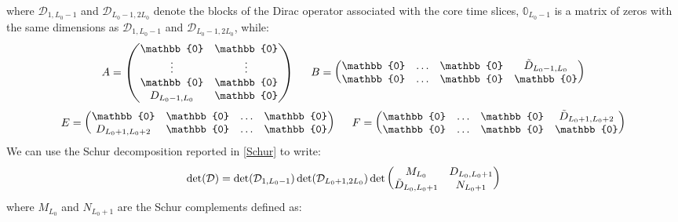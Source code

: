 where $\mathcal{D}_{1, L_0 - 1}$ and $\mathcal{D}_{L_0 - 1, 2L_0}$ denote the blocks of the Dirac operator associated with the core time slices, $\mathbb{0}_{L_0 - 1}$ is a matrix of zeros with the same dimensions as $\mathcal{D}_{1, L_0 - 1}$ and $\mathcal{D}_{L_0 - 1, 2L_0}$, while:
\begin{equation*}
    A = \begin{pmatrix}
         \mathbb{0} & \mathbb{0} \\
        \vdots & \vdots \\
        \mathbb{0} & \mathbb{0} \\
        D_{L_0 - 1, L_0} & \mathbb{0} \\
    \end{pmatrix} \hspace{5mm} B = \begin{pmatrix}
        \mathbb{0} & \dots & \mathbb{0} & \Tilde{D}_{L_0-1, L_0} \\
        \mathbb{0} & \dots & \mathbb{0} & \mathbb{0} \\
    \end{pmatrix}
\end{equation*}
\begin{equation}
    E = \begin{pmatrix}
        \mathbb{0} & \mathbb{0} & \dots & \mathbb{0} \\
        D_{L_0 + 1, L_0 + 2} & \mathbb{0} & \dots & \mathbb{0} \\
    \end{pmatrix} \hspace{5mm} F = \begin{pmatrix}
        \mathbb{0} & \dots & \mathbb{0} & \Tilde{D}_{L_0+1, L_0+2} \\
        \mathbb{0} & \dots & \mathbb{0} & \mathbb{0}\\
    \end{pmatrix}
\end{equation}
We can use the Schur decomposition reported in \eqref{Schur} to write:
\begin{equation}\label{D decomp M N}
    \det(\mathcal{D}) = \det(\mathcal{D}_{1, L_0 - 1}) \det (\mathcal{D}_{L_0 + 1, 2L_0}) \det \begin{pmatrix}
        M_{L_0} & D_{L_0, L_0 + 1} \\
        \Tilde{D}_{L_0, L_0 + 1} & N_{L_0 + 1}
    \end{pmatrix} 
\end{equation}
where $M_{L_0}$ and $N_{L_0 + 1}$ are the Schur complements defined as:

